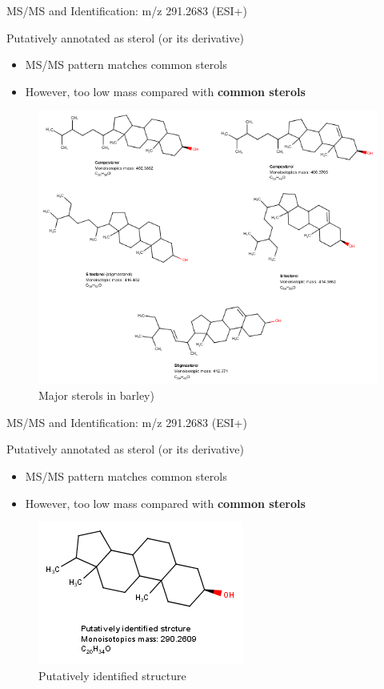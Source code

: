 \documentclass{beamer}
\begin{document}
\begin{frame}{MS/MS and Identification: m/z 291.2683 (ESI+)}
\begin{block} {Putatively annotated as sterol (or its derivative)}
\begin{itemize}
\item MS/MS pattern matches common sterols
\item However, too low mass compared with \textbf{common sterols}
\end{itemize}
\begin{figure}[H]
    \centering
    \includegraphics[scale=0.27]{images/5sterols_combined.png}
    \caption{Major sterols in barley)}
    \label{fig:5sterol}
\end{figure}
\end{block}
\end{frame}

\begin{frame}{MS/MS and Identification: m/z 291.2683 (ESI+)}
\begin{block} {Putatively annotated as sterol (or its derivative)}
\begin{itemize}
\item MS/MS pattern matches common sterols
\item However, too low mass compared with \textbf{common sterols}
\end{itemize}

\begin{figure}[H]
    \centering
    \includegraphics[scale=0.5]{images/possiblesterol.png}
    \caption{Putatively identified structure}
    \label{fig:putativesterol}
\end{figure}

\end{block}
\end{frame}
\end{document}
